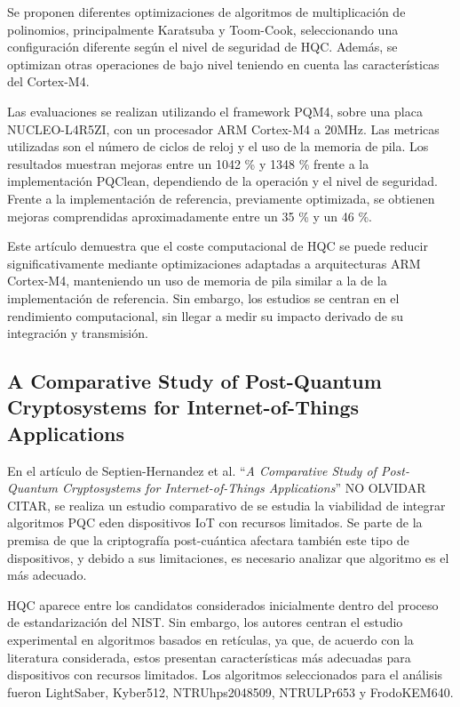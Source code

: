     Se proponen diferentes optimizaciones de algoritmos de multiplicación de polinomios, principalmente Karatsuba y Toom-Cook, seleccionando una configuración 
    diferente según el nivel de seguridad de HQC. Además, se optimizan otras operaciones de bajo nivel teniendo en cuenta las características del Cortex-M4. 

    Las evaluaciones se realizan utilizando el framework PQM4, sobre una placa NUCLEO-L4R5ZI, con un procesador ARM Cortex-M4 a 20MHz. Las metricas utilizadas 
    son el número de ciclos de reloj y el uso de la memoria de pila. Los resultados muestran mejoras entre un 1042 \% y 1348 \% frente a la implementación
    PQClean, dependiendo de la operación y el nivel de seguridad. Frente a la implementación de referencia, previamente optimizada, se obtienen mejoras 
    comprendidas aproximadamente entre un 35 \% y un 46 \%.

    Este artículo demuestra que el coste computacional de HQC se puede reducir significativamente mediante optimizaciones adaptadas a arquitecturas ARM Cortex-M4, 
    manteniendo un uso de memoria de pila similar a la de la implementación de referencia. Sin embargo, los estudios se centran en el rendimiento computacional, 
    sin llegar a medir su impacto derivado de su integración y transmisión. 

    \subsection{A Comparative Study of Post-Quantum Cryptosystems for Internet-of-Things Applications}

    En el artículo de Septien-Hernandez et al. ``\textit{A Comparative Study of Post-Quantum Cryptosystems for Internet-of-Things Applications}'' NO OLVIDAR CITAR, se realiza un estudio comparativo de
    se estudia la viabilidad de integrar algoritmos PQC eden dispositivos IoT con recursos limitados. Se parte de la premisa de que 
    la criptografía post-cuántica afectara también este tipo de dispositivos, y debido a sus limitaciones, es necesario analizar que algoritmo es el más
    adecuado. 

    HQC aparece entre los candidatos considerados inicialmente dentro del proceso de estandarización del NIST. Sin embargo, los autores centran el estudio experimental en 
    algoritmos basados en retículas, ya que, de acuerdo con la literatura considerada, estos presentan características más adecuadas para dispositivos con recursos limitados. 
    Los algoritmos seleccionados para el análisis fueron LightSaber, Kyber512, NTRUhps2048509, NTRULPr653 y FrodoKEM640.

